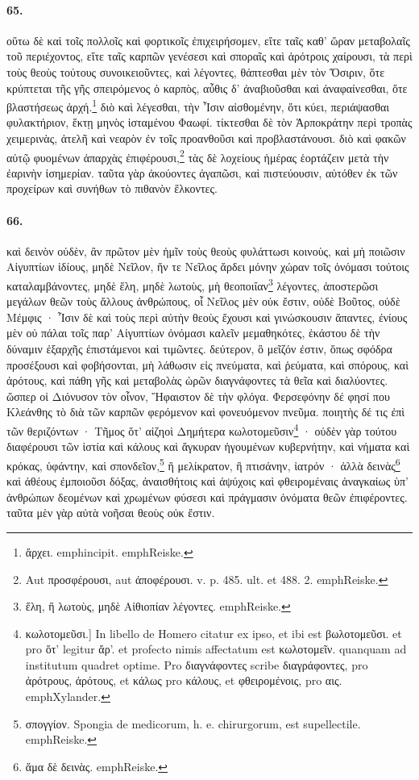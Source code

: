 \documentclass[a4paper, 11pt, oneside, polutonikogreek, german]{article}
\begin{document}
\paragraph{65.}
οὕτω δὲ καὶ τοῖς πολλοῖς καὶ φορτικοῖς ἐπιχειρήσομεν, εἴτε ταῖς καθ' ὥραν μεταβολαῖς τοῦ περιέχοντος, εἴτε ταῖς καρπῶν γενέσεσι καὶ σποραῖς καὶ ἀρότροις χαίρουσι, τὰ περὶ τοὺς θεοὺς τούτους συνοικειοῦντες, καὶ λέγοντες, θάπτεσθαι μὲν τὸν Ὄσιριν, ὅτε κρύπτεται τῆς γῆς σπειρόμενος ὁ καρπὸς, αὖθις δ' ἀναβιοῦσθαι καὶ ἀναφαίνεσθαι, ὅτε βλαστήσεως ἀρχή.\footnote{ἄρχει. emph{incipit.} emph{Reiske.}} διὸ καὶ λέγεσθαι, τὴν Ἶσιν αἰσθομένην, ὅτι κύει, περιάψασθαι φυλακτήριον, ἕκτῃ μηνὸς ἱσταμένου Φαωφί. τίκτεσθαι δὲ τὸν Ἁρποκράτην περὶ τροπὰς χειμερινὰς, ἀτελῆ καὶ νεαρὸν ἐν τοῖς προανθοῦσι καὶ προβλαστάνουσι. διὸ καὶ φακῶν αὐτῷ φυομένων ἀπαρχὰς ἐπιφέρουσι,\footnote{Aut προσφέρουσι, aut ἀποφέρουσι. v. p. 485. ult. et 488. 2. emph{Reiske.}} τὰς δὲ λοχείους ἡμέρας ἑορτάζειν μετὰ τὴν ἐαρινὴν ἰσημερίαν. ταῦτα γὰρ ἀκούοντες ἀγαπῶσι, καὶ πιστεύουσιν, αὐτόθεν ἐκ τῶν προχείρων καὶ συνήθων τὸ πιθανὸν ἕλκοντες.

\paragraph{66.}
καὶ δεινὸν οὐδὲν, ἂν πρῶτον μὲν ἡμῖν τοὺς θεοὺς φυλάττωσι κοινοὺς, καὶ μὴ ποιῶσιν Αἰγυπτίων ἰδίους, μηδὲ Νεῖλον, ἥν τε Νεῖλος ἄρδει μόνην χώραν τοῖς ὀνόμασι τούτοις καταλαμβάνοντες, μηδὲ ἕλη, μηδὲ λωτοὺς, μὴ θεοποιΐαν\footnote{ἕλη, ἢ λωτοὺς, μηδὲ Αἰθιοπίαν λέγοντες. emph{Reiske.}} λέγοντες, ἀποστερῶσι μεγάλων θεῶν τοὺς ἄλλους ἀνθρώπους, οἷ Νεῖλος μὲν οὐκ ἔστιν, οὐδὲ Βοῦτος, οὐδὲ Μέμφις · Ἶσιν δὲ καὶ τοὺς περὶ αὐτὴν θεοὺς ἔχουσι καὶ γινώσκουσιν ἅπαντες, ἐνίους μὲν οὐ πάλαι τοῖς παρ' Αἰγυπτίων ὀνόμασι καλεῖν μεμαθηκότες, ἑκάστου δὲ τὴν δύναμιν ἐξαρχῆς ἐπιστάμενοι καὶ τιμῶντες. δεύτερον, ὃ μεῖζόν ἐστιν, ὅπως σφόδρα προσέξουσι καὶ φοβήσονται, μὴ λάθωσιν εἰς πνεύματα, καὶ ῥεύματα, καὶ σπόρους, καὶ ἀρότους, καὶ πάθη γῆς καὶ μεταβολὰς ὡρῶν διαγνάφοντες τὰ θεῖα καὶ διαλύοντες. ὥσπερ οἱ Διόνυσον τὸν οἶνον, Ἥφαιστον δὲ τὴν φλόγα. Φερσεφόνην δέ φησί που Κλεάνθης τὸ διὰ τῶν καρπῶν φερόμενον καὶ φονευόμενον πνεῦμα. ποιητὴς δέ τις ἐπὶ τῶν θεριζόντων · Τῆμος ὅτ' αἰζηοὶ Δημήτερα κωλοτομεῦσιν\footnote{κωλοτομεῦσι.] In libello de Homero citatur ex ipso, et ibi est βωλοτομεῦσι. et pro ὅτ' legitur ἄρ'. et profecto nimis affectatum est κωλοτομεῖν. quanquam ad institutum quadret optime. Pro διαγνάφοντες scribe διαγράφοντες, pro ἀρότρους, ἀρότους, et κάλως pro κάλους, et φθειρομένοις, pro αις. emph{Xylander.} } · οὐδὲν γὰρ τούτου διαφέρουσι τῶν ἱστία καὶ κάλους καὶ ἄγκυραν ἡγουμένων κυβερνήτην, καὶ νήματα καὶ κρόκας, ὑφάντην, καὶ σπονδεῖον,\footnote{σπογγίον. Spongia de medicorum, h. e. chirurgorum, est supellectile. emph{Reiske.}} ἢ μελίκρατον, ἢ πτισάνην, ἰατρόν · ἀλλὰ δεινὰς\footnote{ἅμα δὲ δεινὰς. emph{Reiske.}} καὶ ἀθέους ἐμποιοῦσι δόξας, ἀναισθήτοις καὶ ἀψύχοις καὶ φθειρομέναις ἀναγκαίως ὑπ' ἀνθρώπων δεομένων καὶ χρωμένων φύσεσι καὶ πράγμασιν ὀνόματα θεῶν ἐπιφέροντες. ταῦτα μὲν γὰρ αὐτὰ νοῆσαι θεοὺς οὐκ ἔστιν.
\end{document}
